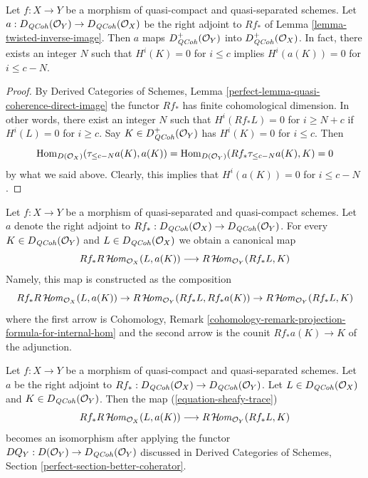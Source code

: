 \begin{lemma}
\label{lemma-twisted-inverse-image-bounded-below}
Let $f : X \to Y$ be a morphism of quasi-compact and quasi-separated
schemes. Let $a : D_{\mathit{QCoh}}(\mathcal{O}_Y) \to D_{\mathit{QCoh}}(\mathcal{O}_X)$
be the right adjoint to $Rf_*$ of Lemma \ref{lemma-twisted-inverse-image}.
Then $a$ maps $D^+_{\mathit{QCoh}}(\mathcal{O}_Y)$ into $D^+_{\mathit{QCoh}}(\mathcal{O}_X)$.
In fact, there exists an integer $N$ such that
$H^i(K) = 0$ for $i \leq c$ implies $H^i(a(K)) = 0$ for $i \leq c - N$.
\end{lemma}

\begin{proof}
By Derived Categories of Schemes, Lemma
\ref{perfect-lemma-quasi-coherence-direct-image}
the functor $Rf_*$ has finite cohomological dimension. In other words,
there exist an integer $N$ such that
$H^i(Rf_*L) = 0$ for $i \geq N + c$ if $H^i(L) = 0$ for $i \geq c$.
Say $K \in D^+_{\mathit{QCoh}}(\mathcal{O}_Y)$ has $H^i(K) = 0$ for $i \leq c$.
Then
$$
\mathop{\mathrm{Hom}}\nolimits_{D(\mathcal{O}_X)}(\tau_{\leq c - N}a(K), a(K)) =
\mathop{\mathrm{Hom}}\nolimits_{D(\mathcal{O}_Y)}(Rf_*\tau_{\leq c - N}a(K), K) = 0
$$
by what we said above. Clearly, this implies that
$H^i(a(K)) = 0$ for $i \leq c - N$.
\end{proof}

\noindent
Let $f : X \to Y$ be a morphism of quasi-separated and quasi-compact
schemes. Let $a$ denote the right adjoint to
$Rf_* : D_{\mathit{QCoh}}(\mathcal{O}_X) \to D_{\mathit{QCoh}}(\mathcal{O}_Y)$. For every
$K \in D_{\mathit{QCoh}}(\mathcal{O}_Y)$ and $L \in D_{\mathit{QCoh}}(\mathcal{O}_X)$
we obtain a canonical map
\begin{equation}
\label{equation-sheafy-trace}
Rf_*R\mathop{\mathcal{H}\!\mathit{om}}\nolimits_{\mathcal{O}_X}(L, a(K))
\longrightarrow
R\mathop{\mathcal{H}\!\mathit{om}}\nolimits_{\mathcal{O}_Y}(Rf_*L, K)
\end{equation}
Namely, this map is constructed as the composition
$$
Rf_*R\mathop{\mathcal{H}\!\mathit{om}}\nolimits_{\mathcal{O}_X}(L, a(K)) \to
R\mathop{\mathcal{H}\!\mathit{om}}\nolimits_{\mathcal{O}_Y}(Rf_*L, Rf_*a(K)) \to
R\mathop{\mathcal{H}\!\mathit{om}}\nolimits_{\mathcal{O}_Y}(Rf_*L, K)
$$
where the first arrow is 
Cohomology, Remark
\ref{cohomology-remark-projection-formula-for-internal-hom}
and the second arrow is the counit $Rf_*a(K) \to K$ of the adjunction.

\begin{lemma}
\label{lemma-iso-on-RSheafHom}
Let $f : X \to Y$ be a morphism of quasi-compact and quasi-separated schemes.
Let $a$ be the right adjoint to
$Rf_* : D_{\mathit{QCoh}}(\mathcal{O}_X) \to D_{\mathit{QCoh}}(\mathcal{O}_Y)$.
Let $L \in D_{\mathit{QCoh}}(\mathcal{O}_X)$ and $K \in D_{\mathit{QCoh}}(\mathcal{O}_Y)$.
Then the map (\ref{equation-sheafy-trace})
$$
Rf_*R\mathop{\mathcal{H}\!\mathit{om}}\nolimits_{\mathcal{O}_X}(L, a(K))
\longrightarrow
R\mathop{\mathcal{H}\!\mathit{om}}\nolimits_{\mathcal{O}_Y}(Rf_*L, K)
$$
becomes an isomorphism after applying the functor
$DQ_Y : D(\mathcal{O}_Y) \to D_{\mathit{QCoh}}(\mathcal{O}_Y)$
discussed in Derived Categories of Schemes, Section
\ref{perfect-section-better-coherator}.
\end{lemma}

